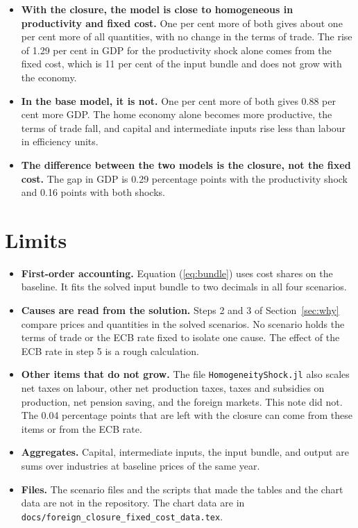 \documentclass[11pt,a4paper]{article}
\newcommand{\code}[1]{\texttt{#1}}
\begin{document}
\begin{itemize}
\item \textbf{With the closure, the model is close to homogeneous in productivity and fixed cost.} One per cent more of both gives about one per cent more of all quantities, with no change in the terms of trade. The rise of 1.29 per cent in GDP for the productivity shock alone comes from the fixed cost, which is 11 per cent of the input bundle and does not grow with the economy.
\item \textbf{In the base model, it is not.} One per cent more of both gives 0.88 per cent more GDP. The home economy alone becomes more productive, the terms of trade fall, and capital and intermediate inputs rise less than labour in efficiency units.
\item \textbf{The difference between the two models is the closure, not the fixed cost.} The gap in GDP is 0.29 percentage points with the productivity shock and 0.16 points with both shocks.
\end{itemize}

\section{Limits}

\begin{itemize}
\item \textbf{First-order accounting.} Equation (\ref{eq:bundle}) uses cost shares on the baseline. It fits the solved input bundle to two decimals in all four scenarios.
\item \textbf{Causes are read from the solution.} Steps 2 and 3 of Section~\ref{sec:why} compare prices and quantities in the solved scenarios. No scenario holds the terms of trade or the ECB rate fixed to isolate one cause. The effect of the ECB rate in step 5 is a rough calculation.
\item \textbf{Other items that do not grow.} The file \code{HomogeneityShock.jl} also scales net taxes on labour, other net production taxes, taxes and subsidies on production, net pension saving, and the foreign markets. This note did not. The 0.04 percentage points that are left with the closure can come from these items or from the ECB rate.
\item \textbf{Aggregates.} Capital, intermediate inputs, the input bundle, and output are sums over industries at baseline prices of the same year.
\item \textbf{Files.} The scenario files and the scripts that made the tables and the chart data are not in the repository. The chart data are in \code{docs/foreign\_closure\_fixed\_cost\_data.tex}.
\end{itemize}
\end{document}
